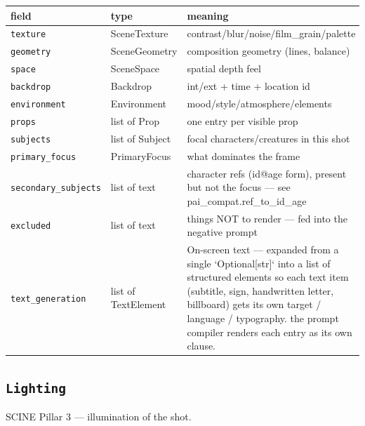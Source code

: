 \begin{longtable}{@{}R{0.24\textwidth}R{0.21\textwidth}R{0.49\textwidth}@{}}
\toprule \textbf{field} & \textbf{type} & \textbf{meaning} \\ \midrule
\endhead
\texttt{texture} & SceneTexture & contrast/\allowbreak{}blur/\allowbreak{}noise/\allowbreak{}film\_\allowbreak grain/\allowbreak{}palette \\
\texttt{geometry} & SceneGeometry & composition geometry (lines, balance) \\
\texttt{space} & SceneSpace & spatial depth feel \\
\texttt{backdrop} & Backdrop & int/\allowbreak{}ext + time + location id \\
\texttt{environment} & Environment & mood/\allowbreak{}style/\allowbreak{}atmosphere/\allowbreak{}elements \\
\texttt{props} & list of Prop & one entry per visible prop \\
\texttt{subjects} & list of Subject & focal characters/\allowbreak{}creatures in this shot \\
\texttt{primary\_\allowbreak focus} & PrimaryFocus & what dominates the frame \\
\texttt{secondary\_\allowbreak subjects} & list of text & character refs (id@age form), present but not the focus ---\allowbreak{} see pai\_\allowbreak compat.ref\_\allowbreak to\_\allowbreak id\_\allowbreak age \\
\texttt{excluded} & list of text & things NOT to render ---\allowbreak{} fed into the negative prompt \\
\texttt{text\_\allowbreak generation} & list of TextElement & On-screen text ---\allowbreak{} expanded from a single `Optional[str]` into a list of structured elements so each text item (subtitle, sign, handwritten letter, billboard) gets its own target /\allowbreak{} language /\allowbreak{} typography. the prompt compiler renders each entry as its own clause. \\
\bottomrule
\end{longtable}

\subsection*{\texttt{Lighting}}
\noindent SCINE Pillar 3 ---\allowbreak{} illumination of the shot.

